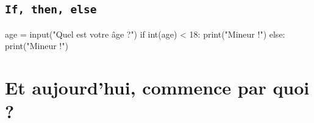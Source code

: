 \documentclass[12pt,a4paper, oneside]{article}
\theoremstyle{definition}
\begin{document}
   \subsection{\texttt{If, then, else}}
   \begin{minipage}{.4\textwidth}
    \begin{pyverbatim}
   age = input("Quel est votre âge ?")
   if int(age) < 18:
     print("Mineur !")
   else:
     print("Mineur !")
    \end{pyverbatim}
   \end{minipage}
   \hfill\begin{minipage}{.4\textwidth}
     \begin{center}
       \begin{scratch}[scale=.8]
       \end{scratch}
     \end{center}
   \end{minipage}

\section{Et aujourd'hui, commence par quoi ?} \label{sec:et-aujourd'hui-on-fait-quoi-?}
\end{document}

